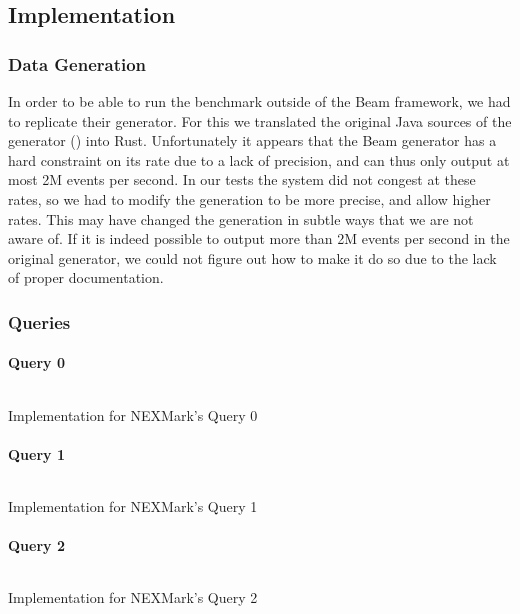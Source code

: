 \subsection{Implementation}
\subsubsection{Data Generation}
In order to be able to run the benchmark outside of the Beam framework, we had to replicate their generator. For this we translated the original Java sources of the generator () into Rust. Unfortunately it appears that the Beam generator has a hard constraint on its rate due to a lack of precision, and can thus only output at most 2M events per second. In our tests the system did not congest at these rates, so we had to modify the generation to be more precise, and allow higher rates. This may have changed the generation in subtle ways that we are not aware of. If it is indeed possible to output more than 2M events per second in the original generator, we could not figure out how to make it do so due to the lack of proper documentation.

\subsubsection{Queries}
\paragraph{Query 0}
\begin{listing}[H]
  \inputminted[firstline=400,lastline=400]{rust}{benchmarks/src/nexmark.rs}
  \caption{Implementation for NEXMark's Query 0}
  \label{lst:nexmark-query0}
\end{listing}

\paragraph{Query 1}
\begin{listing}[H]
  \inputminted[firstline=425,lastline=427]{rust}{benchmarks/src/nexmark.rs}
  \caption{Implementation for NEXMark's Query 1}
  \label{lst:nexmark-query1}
\end{listing}

\paragraph{Query 2}
\begin{listing}[H]
  \inputminted[firstline=459,lastline=462]{rust}{benchmarks/src/nexmark.rs}
  \caption{Implementation for NEXMark's Query 2}
  \label{lst:nexmark-query2}
\end{listing}

